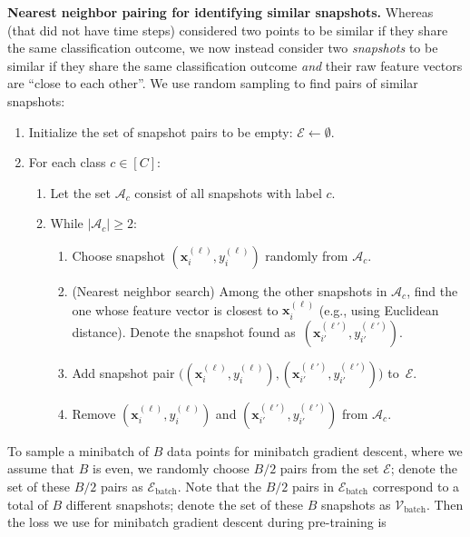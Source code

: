 \noindent
\textbf{Nearest neighbor pairing for identifying similar snapshots.}
\label{ch02:sec:nearest-neighbor-refinement}
Whereas  (that did not have time steps) considered two points to be similar if they share the same classification outcome, we now instead consider two \emph{snapshots} to be similar if they share the same classification outcome \emph{and} their raw feature vectors are ``close to each other''.
We use random sampling to find pairs of similar snapshots:
\begin{enumerate}
\small
\item Initialize the set of snapshot pairs to be empty: $\mathcal{E} \leftarrow \emptyset$.
\item For each class $c\in[C]$:
\begin{enumerate}
\item 
Let the set $\mathcal{A}_c$ consist of all snapshots with label $c$.
\item While $|\mathcal{A}_c| \ge 2$:
\begin{enumerate}
\item Choose snapshot $(\mathbf{x}_i^{(\ell)}, y_i^{(\ell)})$ randomly from $\mathcal{A}_c$.
\item (Nearest neighbor search) Among the other snapshots in $\mathcal{A}_c$, find the one whose feature vector is closest to $\mathbf{x}_i^{(\ell)}$ (e.g., using Euclidean distance).
Denote the snapshot found as~$(\mathbf{x}_{i'}^{(\ell')}, y_{i'}^{(\ell')})$.
\item Add snapshot pair $\big((\mathbf{x}_i^{(\ell)}, y_i^{(\ell)}),(\mathbf{x}_{i'}^{(\ell')}, y_{i'}^{(\ell')})\big)$ to~$\mathcal{E}$.
\item Remove $(\mathbf{x}_i^{(\ell)}, y_i^{(\ell)})$ and $(\mathbf{x}_{i'}^{(\ell')}, y_{i'}^{(\ell')})$ from $\mathcal{A}_c$.
\end{enumerate}
\end{enumerate}
\end{enumerate}
To sample a minibatch of $B$ data points for minibatch gradient descent, where we assume that $B$ is even, we randomly choose $B/2$ pairs from the set $\mathcal{E}$; denote the set of these $B/2$ pairs as $\mathcal{E}_{\text{batch}}$.
Note that the $B/2$ pairs in $\mathcal{E}_{\text{batch}}$ correspond to a total of $B$ different snapshots; denote the set of these $B$ snapshots as $\mathcal{V}_{\text{batch}}$.
Then the loss we use for minibatch gradient descent during pre-training is
